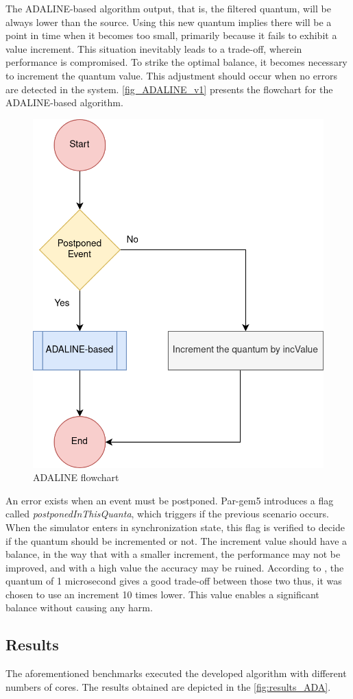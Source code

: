 The ADALINE-based algorithm output, that is, the filtered quantum, will be always lower than the source. Using this new quantum implies there will 
be a point in time when it becomes too small, primarily because it fails to exhibit a value increment. This situation inevitably leads to a 
trade-off, wherein performance is compromised. To strike the optimal balance, it becomes necessary to increment the quantum value. This adjustment 
should occur when no errors are detected in the system. \autoref{fig_ADALINE_v1} presents the flowchart for the ADALINE-based algorithm.

\begin{figure}[H]
 	\includegraphics[width=0.4\linewidth]{Images/ADALINE_v1.png}
 	\caption{ADALINE flowchart}
	 \label{fig_ADALINE_v1}
\end{figure}

An error exists when an event must be postponed. Par-gem5 \cite{pargem5} introduces a flag called \textit{postponedInThisQuanta}, which triggers 
if the previous scenario occurs. When the simulator enters in synchronization state, this flag is verified to decide if the quantum should be 
incremented or not. The increment value should have a balance, in the way that with a smaller increment, the performance may not be improved, and 
with a high value the accuracy may be ruined. According to \cite{pargem5}, the quantum of 1 microsecond gives a good trade-off between those 
two thus, it was chosen to use an increment 10 times lower. This value enables a significant balance without causing any harm.

\subsection{Results}

The aforementioned benchmarks executed the developed algorithm with different numbers of cores. The results obtained are depicted in the 
\autoref{fig:results_ADA}. 

